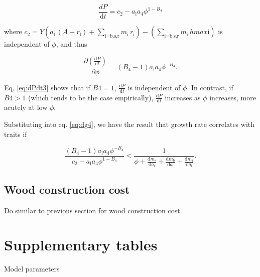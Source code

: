 \documentclass[12pt, a4paper]{article}
\begin{document}
\begin{appendices}
\begin{equation}\label{eq:dPdt2}
\frac{dP}{\textrm{d}t} = c_2 - a_\textrm{l} a_4 \phi ^{1-B_4}
\end{equation}

where
$c_2 = Y ( a_\textrm{l} \, (A - r_\textrm{l}) + \sum_\textrm{i=b,s,r}{m_\textrm{i} \, r_\textrm{i}}) - (\sum_\textrm{i=b,s,r}{m_\textrm{i} \, hmax\textrm{i}})$
is independent of $\phi$, and thus

\begin{equation}\label{eq:dPdt3}
\frac{\partial \left( \frac{ \textrm{d}P} {\textrm{d}t}\right)}{\partial \phi}  =
(B_4-1) a_\textrm{l} a_4\phi ^{-B_4}.
\end{equation}

Eq. \ref{eq:dPdt3} shows that if $B4=1$, $\frac{ \textrm{d}P} {\textrm{d}t}$ is independent
of $\phi$. In contrast, if $B4>1$ (which tends to be the case empirically), $\frac{ \textrm
{d}P} {\textrm{d}t}$ increases as $\phi$ increases, more acutely at low $\phi$.

Substituting into eq. \ref{eq:dg4}, we have the result that growth rate correlates
with traits if

\begin{equation} \label{eq:G6}
\frac{(B_4-1) a_\textrm{l} a_4\phi ^{-B_4}}{c_2 - a_\textrm{l} a_4 \phi ^{1-B_4}}
< \frac{1}{\phi
 + \frac{\textrm{d}m_\textrm{s}}{\textrm{d}a_\textrm{l}} + \frac{\textrm{d}m_\textrm
 {b}}{\textrm{d}a_\textrm{l}} + \frac{\textrm{d}m_\textrm{r}}{\textrm{d}a_\textrm{l}}}.
\end{equation}

\subsection{Wood construction cost}

Do similar to previous section for wood construction cost.

\newpage

\section{Supplementary tables}\label{supplementary-tables}

\begin{table}[h]
\caption{Model parameters}
\centering
{\footnotesize  %
\begin{doublespace}


\end{doublespace}
}
\label{tab:params}
\end{table}


\end{appendices}
\end{document}
